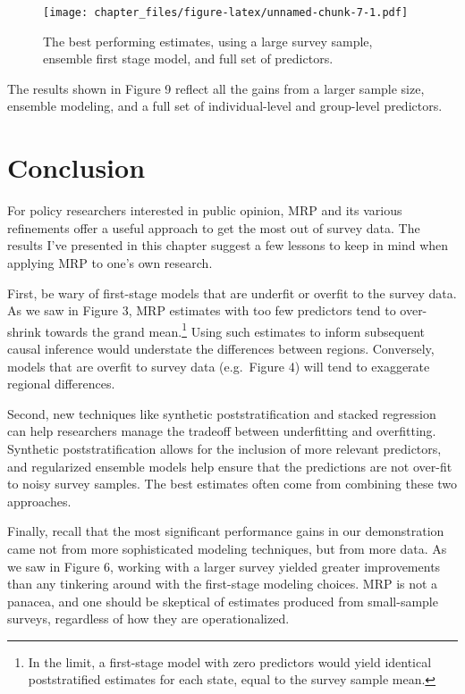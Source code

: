 \documentclass[
]{article}
\begin{document}
\begin{figure}
\centering
\texttt{[image: chapter\_files/figure-latex/unnamed-chunk-7-1.pdf]}
\caption{The best performing estimates, using a large survey sample,
ensemble first stage model, and full set of predictors.}
\end{figure}

The results shown in Figure 9 reflect all the gains from a larger sample
size, ensemble modeling, and a full set of individual-level and
group-level predictors.

\hypertarget{conclusion}{%
\section{Conclusion}\label{conclusion}}

For policy researchers interested in public opinion, MRP and its various
refinements offer a useful approach to get the most out of survey data.
The results I've presented in this chapter suggest a few lessons to keep
in mind when applying MRP to one's own research.

First, be wary of first-stage models that are underfit or overfit to the
survey data. As we saw in Figure 3, MRP estimates with too few
predictors tend to over-shrink towards the grand mean.\footnote{In the
  limit, a first-stage model with zero predictors would yield identical
  poststratified estimates for each state, equal to the survey sample
  mean.} Using such estimates to inform subsequent causal inference
would understate the differences between regions. Conversely, models
that are overfit to survey data (e.g.~Figure 4) will tend to exaggerate
regional differences.

Second, new techniques like synthetic poststratification and stacked
regression can help researchers manage the tradeoff between underfitting
and overfitting. Synthetic poststratification allows for the inclusion
of more relevant predictors, and regularized ensemble models help ensure
that the predictions are not over-fit to noisy survey samples. The best
estimates often come from combining these two approaches.

Finally, recall that the most significant performance gains in our
demonstration came not from more sophisticated modeling techniques, but
from more data. As we saw in Figure 6, working with a larger survey
yielded greater improvements than any tinkering around with the
first-stage modeling choices. MRP is not a panacea, and one should be
skeptical of estimates produced from small-sample surveys, regardless of
how they are operationalized.
\end{document}
